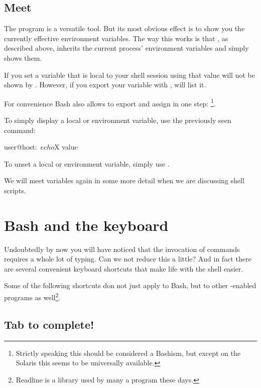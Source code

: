 \documentclass{olli-handout}
\begin{document}
\subsection{Meet }\label{env_cmd}

The  program is a versatile tool. But its most obvious effect is to show you the currently effective environment variables. The way this works is that , as described above, inherits the current process' environment variables and simply shows them.

If you set a variable that is local to your shell session using  that value will not be shown by . However, if you export your variable with ,  will list it.

For convenience Bash also allows to export and assign in one step: \footnote{Strictly speaking this should be considered a Bashism, but except on the Solaris  this seems to be universally available.}.

To simply display a local or environment variable, use the previously seen  command:

\begin{lstbash}
user@host:~$ echo $X
value
\end{lstbash}

To unset a local or environment variable, simply use .

{\olliHandLeft} We will meet variables again in some more detail when we are discussing shell scripts.

\section{Bash and the keyboard}

\begin{refmanbash}
\end{refmanbash}

Undoubtedly by now you will have noticed that the invocation of commands requires a whole lot of typing. Can we not reduce this a little? And in fact there are several convenient keyboard shortcuts that make life with the shell easier.

Some of the following shortcuts don not just apply to Bash, but to other -enabled programs as well\footnote{Readline is a library used by many a program these days.}.

\subsection{Tab to complete!}
\end{document}

